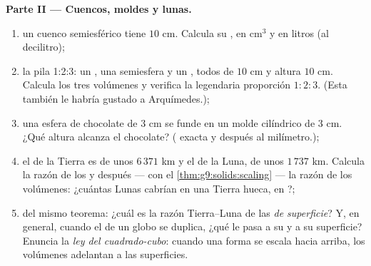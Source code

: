 \begin{problem}
\medskip
\noindent\textbf{Parte II --- Cuencos, moldes y lunas.}
\begin{enumerate}[resume]
  \item un cuenco semiesférico tiene  $10$ cm. Calcula su
        , en cm$^3$ y en litros (al decilitro);
  \item la pila 1:2:3: un , una semiesfera y un ,
        todos de  $10$ cm y altura $10$ cm. Calcula los
        tres volúmenes y verifica la legendaria proporción
        $1 : 2 : 3$. (Esta también le habría gustado a
        Arquímedes.);
  \item una esfera de chocolate de  $3$ cm se funde en un
        molde cilíndrico de  $3$ cm. ¿Qué altura alcanza el
        chocolate? ( exacta y después al
        milímetro.);
  \item el  de la Tierra es de unos $6\,371$ km y el de la Luna,
        de unos $1\,737$ km. Calcula la razón de los  y después
        --- con el \cref{thm:g9:solids:scaling} --- la razón de
        los volúmenes: ¿cuántas Lunas cabrían en una Tierra
        hueca, en ?;
  \item del mismo teorema: ¿cuál es la razón Tierra--Luna de las
        \emph{ de superficie}? Y, en general, cuando el
         de un globo se duplica, ¿qué le pasa a su  y a su
        superficie? Enuncia la \emph{ley del cuadrado-cubo}: cuando una forma
        se escala hacia arriba, los volúmenes adelantan a las superficies.
\end{enumerate}


\end{problem}
